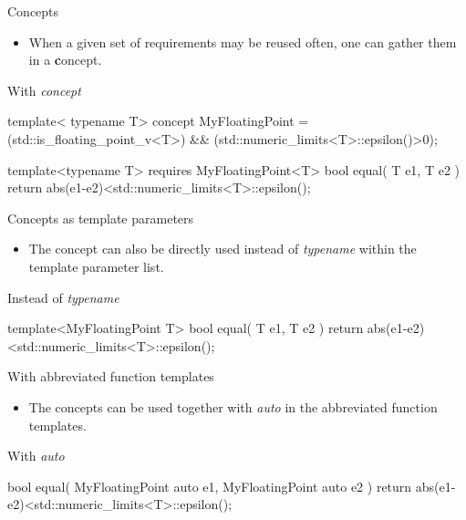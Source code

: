 \begin{frame}[fragile]
    \begin{block}{Concepts}
      \begin{itemize}
        \item When a given set of requirements may be reused often, one can gather them in a {\textbf concept}.
      \end{itemize}
    \end{block}
    \begin{exampleblock}{With {\it concept}}
      \scriptsize
      \begin{cppcode*}{}
      template< typename T>
      concept MyFloatingPoint =
        (std::is_floating_point_v<T>) &&
        (std::numeric_limits<T>::epsilon()>0);

      template<typename T>
      requires MyFloatingPoint<T>
      bool equal( T e1, T e2 )
      { return abs(e1-e2)<std::numeric_limits<T>::epsilon(); }
      \end{cppcode*}
    \end{exampleblock}
\end{frame}

\begin{frame}[fragile]
    \begin{block}{Concepts as template parameters}
      \begin{itemize}
        \item The concept can also be directly used instead of {\it typename} within the template parameter list.
      \end{itemize}
    \end{block}
    \begin{exampleblock}{Instead of {\it typename}}
      \scriptsize
      \begin{cppcode*}{}
      template<MyFloatingPoint T>
      bool equal( T e1, T e2 )
      { return abs(e1-e2)<std::numeric_limits<T>::epsilon(); }
      \end{cppcode*}
    \end{exampleblock}
\end{frame}

\begin{frame}[fragile]
    \begin{block}{With abbreviated function templates}
      \begin{itemize}
        \item The concepts can be used together with {\it auto} in the abbreviated function templates.
      \end{itemize}
    \end{block}
    \begin{exampleblock}{With {\it auto}}
      \scriptsize
      \begin{cppcode*}{}
      bool equal( MyFloatingPoint auto e1, MyFloatingPoint auto e2 )
      { return abs(e1-e2)<std::numeric_limits<T>::epsilon(); }
      \end{cppcode*}
    \end{exampleblock}
\end{frame}

